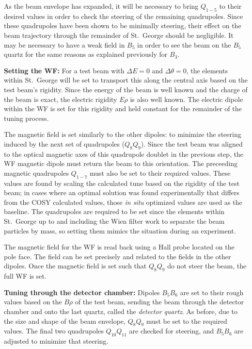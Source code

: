 As the beam envelope has expanded, it will be necessary to bring
$Q_{1-5}$ to their desired values in order to check the steering of the
remaining quadrupoles. Since these quadrupoles have been shown to be
minimally steering, their effect on the beam trajectory through the
remainder of St.\ George should be negligible. It may be necessary to
have a weak field in $B_5$ in order to see the beam on the $B_5$ quartz
for the same reasons as explained previously for $B_3$.

\textbf{Setting the WF:}
For a test beam with $\Delta E = 0$ and $\Delta\theta = 0$, the elements
within St.\ George will be set to transport this along the central axis
based on the test beam's rigidity. Since the energy of the beam is well
known and the charge of the beam is exact, the electric rigidity $E\rho$
is also well known. The electric dipole within the WF is set for this
rigidity and held constant for the remainder of the tuning process.

The magnetic field is set similarly to the other dipoles: to minimize
the steering induced by the next set of quadrupoles ($Q_8Q_9$). Since
the test beam was aligned to the optical magnetic axes of this
quadrupole doublet in the previous step, the WF magnetic dipole must
return the beam to this orientation. The preceeding magnetic quadrupoles
$Q_{1-7}$ must also be set to their required values. These values are
found by scaling the calculated tune based on the rigidity of the test
beam; in cases where an optimal solution was found experimentally that
differs from the COSY calculated values, those \emph{in situ} optimized
values are used as the baseline. The quadrupoles are required to be set
since the elements within St.\ George up to and including the Wien filter
work to separate the beam particles by mass, so setting them mimics the
situation during an experiment.

The magnetic field for the WF is read back using a Hall probe located on
the pole face. The field can be set precisely and related to the fields
in the other dipoles. Once the magnetic field is set such that $Q_8Q_9$
do not steer the beam, the full WF is set.

\textbf{Tuning through the detector chamber:}
Dipoles $B_5B_6$ are set to their rough values based on the $B\rho$ of
the test beam, sending the beam through the detector chamber and onto
the last quartz, called the \emph{detector quartz}. As before, due to
the size and shape of the beam envelope, $Q_8Q_9$ must be set to the
required values. The final two quadrupoles $Q_{10}Q_{11}$ are checked
for steering, and $B_5B_6$ are adjusted to minimize that steering.

